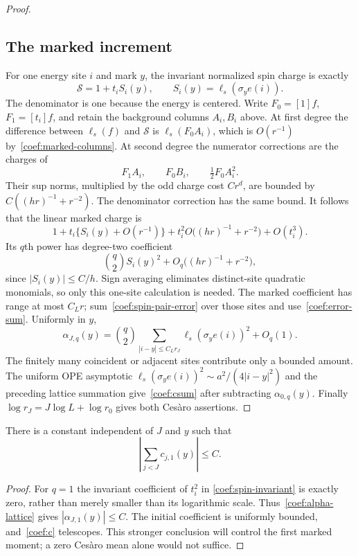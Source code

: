 \begin{proof}
\subsection*{The marked increment}
For one energy site $i$ and mark $y$, the invariant normalized spin charge
is exactly
\begin{equation}\label{coef:spin-invariant}
 \mathcal S=1+t_i S_i(y),\qquad
 S_i(y)=\ell_s(\sigma_y e(i)).
\end{equation}
The denominator is one because the energy is centered.  Write
$F_0=[1]f$, $F_1=[t_i]f$, and retain the background columns $A_i,B_i$
above.  At first degree the difference between
$\ell_s(f)$ and $\mathcal S$ is $\ell_s(F_0A_i)$, which is $O(r^{-1})$
by~\eqref{coef:marked-columns}.  At second degree the numerator corrections
are the charges of
\[
 F_1A_i,\qquad F_0B_i,\qquad \tfrac12F_0A_i^2.
\]
Their sup norms, multiplied by the odd charge cost $Cr^d$, are bounded by
$C((hr)^{-1}+r^{-2})$.  The denominator correction has the same bound.
It follows that the linear marked charge is
\[
 1+t_i\{S_i(y)+O(r^{-1})\}
       +t_i^2 O\bigl((hr)^{-1}+r^{-2}\bigr)+O(t_i^3).
\]
Its $q$th power has degree-two coefficient
\begin{equation}\label{coef:spin-pair-error}
 \binom q2 S_i(y)^2+O_q\bigl((hr)^{-1}+r^{-2}\bigr),
\end{equation}
since $|S_i(y)|\le C/h$.  Sign averaging eliminates distinct-site quadratic
monomials, so only this one-site calculation is needed.  The marked
coefficient has range at most $C_Lr$; sum~\eqref{coef:spin-pair-error} over
those sites and use~\eqref{coef:error-sum}.  Uniformly in $y$,
\begin{equation}\label{coef:alpha-lattice}
 \alpha_{J,q}(y)=\binom q2
       \sum_{|i-y|\le C_Lr_J}\ell_s(\sigma_y e(i))^2+O_q(1).
\end{equation}
The finitely many coincident or adjacent sites contribute only a bounded
amount.  The uniform OPE asymptotic
$\ell_s(\sigma_y e(i))^2\sim a^2/(4|i-y|^2)$ and the preceding lattice
summation give~\eqref{coef:csum} after subtracting $\alpha_{0,q}(y)$.
Finally $\log r_J=J\log L+\log r_0$ gives both Ces\`aro assertions.
\end{proof}

\begin{corollary}\label{coef:bounded-first}
There is a constant independent of $J$ and $y$ such that
\[
 \left|\sum_{j<J}c_{j,1}(y)\right|\le C.
\]
\end{corollary}

\begin{proof}
For $q=1$ the invariant coefficient of $t_i^2$ in
\eqref{coef:spin-invariant} is exactly zero, rather than merely smaller
than its logarithmic scale.  Thus~\eqref{coef:alpha-lattice} gives
$|\alpha_{J,1}(y)|\le C$.  The initial coefficient is uniformly bounded,
and~\eqref{coef:c} telescopes.  This stronger conclusion will control the
first marked moment; a zero Ces\`aro mean alone would not suffice.
\end{proof}
